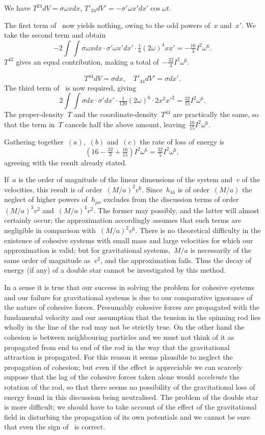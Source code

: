 \documentclass[12pt]{book}
\begin{document}
We have $T^{24}dV = \sigma\omega x dx$, $T'_{24}dV' = -\sigma'\omega x' dx' \cos\omega t$.

The first term of~ now yields nothing, owing to the odd powers of~$x$ and~$x'$.
We take the second term and obtain
\[
-2\int\int\sigma\omega x dx \cdot \sigma'\omega x' dx'\cdot\tfrac{1}{6} (2\omega)^4 x x' = -\tfrac{16}{3}I^2\omega^6.
\]
$T^{42}$ gives an equal contribution, making a total of~$-\tfrac{32}{3}I^2\omega^6$.

\[
T^{44} dV = \sigma dx, \quad T'_{44} dV' = \sigma dx'.
\]
The third term of~ is now required, giving
\[
2\int\int\sigma dx\cdot\sigma' dx' \cdot\tfrac{1}{120}(2\omega)^6\cdot 2 x^2 x'^2 = \tfrac{32}{15}I^2\omega^6.
\]
The proper-density~$T$ and the coordinate-density~$T^{44}$ are practically the same, so that the term in~$T$
cancels half the above amount, leaving~$\tfrac{16}{15}I^2\omega^6$.

Gathering together~$(a)$,~$(b)$ and~$(c)$ the rate of loss of energy is
\[
(16-\tfrac{32}{3}+\tfrac{16}{15})I^2\omega^6=\tfrac{32}{5}I^2\omega^6,
\]
agreeing with the result already stated.

If~$a$ is the order of magnitude of the linear dimensions of the system and~$v$ of the velocities,
this result is of order~$(M/a)^2 v^6$.
Since~$h_{44}$ is of order~$(M/a)$ the neglect of higher powers of~$h_{\mu\nu}$ excludes from the discussion terms
of order~$(M/a)^3 v^2$ and~$(M/a)^4 v^2$.
The former may possibly, and the latter will almost certainly occur;
the approximation accordingly assumes that such terms are negligible in comparison with~$(M/a)^2 v^6$.
There is no theoretical difficulty in the existence of cohesive systems with small mass and large velocities
for which our approximation is valid; but for gravitational systems,~$M/a$ is necessarily of the same order
of magnitude as~$v^2$, and the approximation fails.
Thus the decay of energy (if any) of a double star cannot be investigated by this method.

In a sense it is true that our success in solving the problem for cohesive systems and our failure for
gravitational systems is due to our comparative ignorance of the nature of cohesive forces.
Presumably cohesive forces are propagated with the fundamental velocity and our assumption that the tension
in the spinning rod lies wholly in the line of the rod may not be strictly true.
On the other hand the cohesion is between neighbouring particles and we must not think of it as propagated
from end to end of the rod in the way that the gravitational attraction is propagated.
For this reason it seems plausible to neglect the propagation of cohesion; but even if the effect is
appreciable we can scarcely suppose that the lag of the cohesive forces taken alone would \emph{accelerate}
the rotation of the rod, so that there seems no possibility of the gravitational loss of energy found in this
discussion being neutralised.
The problem of the double star is more difficult; we should have to take account of the effect of the
gravitational field in disturbing the propagation of its own potentials and we cannot be sure that even the
sign of~ is correct.
\end{document}

